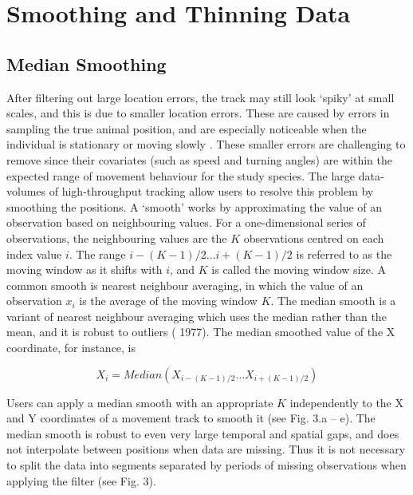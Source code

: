 \documentclass[10pt,paper=a4,headings=standardclasses
]{scrartcl}
\begin{document}
\section{Smoothing and Thinning Data}

\subsection{Median Smoothing}

After filtering out large location errors, the track may still look ‘spiky’ at small scales, and this is due to smaller location errors.
These are caused by errors in sampling the true animal position, and are especially noticeable when the individual is stationary or moving slowly \citep{noonan2019}.
These smaller errors are challenging to remove since their covariates (such as speed and turning angles) are within the expected range of movement behaviour for the study species. 
The large data-volumes of high-throughput tracking allow users to resolve this problem by smoothing the positions. 
A ‘smooth’ works by approximating the value of an observation based on neighbouring values.
For a one-dimensional series of observations, the neighbouring values are the $K$ observations centred on each index value $i$.
The range $ {i - (K-1)/2} \ldots {i + (K-1)/2} $ is referred to as the moving window as it shifts with $i$, and $K$ is called the moving window size.
A common smooth is nearest neighbour averaging, in which the value of an observation $x_i$ is the average of the moving window $K$.
The median smooth is a variant of nearest neighbour averaging which uses the median rather than the mean, and it is robust to outliers (\citeauthor{tukey1977} 1977).
The median smoothed value of the X coordinate, for instance, is
%
\begin{linenomath*}
    \begin{equation*}
        X_i = Median(X_{i - (K-1)/2} \ldots X_{i + (K-1)/2})
     \end{equation*}
\end{linenomath*}
%
Users can apply a median smooth with an appropriate $K$ independently to the X and Y coordinates of a movement track to smooth it (see Fig. 3.a -- e).
The median smooth is robust to even very large temporal and spatial gaps, and does not interpolate between positions when data are missing. 
Thus it is not necessary to split the data into segments separated by periods of missing observations when applying the filter (see Fig. 3).
\end{document}
